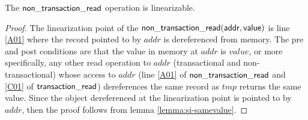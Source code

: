 \begin{lemma}
\label{lemma:si-ntread}
The $\sf{non\_transaction\_read}$ operation is linearizable.
\end{lemma}
\begin{proof}
The linearization point of the $\sf{non\_transaction\_read}(addr, value)$ is line \ref{A01} where the record
pointed to by $\mathit{addr}$ is dereferenced from memory.
The pre and post conditions are that the value in memory at $\mathit{addr}$ is $\mathit{value}$, or more specifically, 
any other read operation to $\mathit{addr}$ (transactional and non-transactional) whose access to $\mathit{addr}$
(line \ref{A01} of $\sf{non\_transaction\_read}$ and \ref{C01} of $\sf{transaction\_read}$) dereferences
the same record as $\mathit{tmp}$ returns the same value.
Since the object dereferenced at the linearization point is pointed to by $\mathit{addr}$, then the proof follows from
lemma \ref{lemma:si-samevalue}.
\end{proof}



